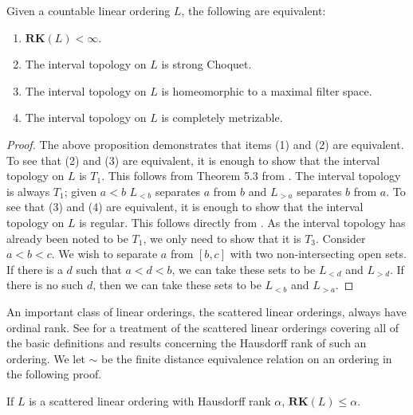 \documentclass[11pt]{amsart}
\theoremstyle{remark}
\def\RK{\textbf{RK}}
\begin{document}
\begin{theorem}
Given a countable linear ordering $L$, the following are equivalent:
\begin{enumerate}
	\item $\RK(L)<\infty$.
	\item The interval topology on $L$ is strong Choquet.
	\item The interval topology on $L$ is homeomorphic to a maximal filter space.
	\item The interval topology on $L$ is completely metrizable.
\end{enumerate}
\end{theorem}


\begin{proof}
The above proposition demonstrates that items (1) and (2) are equivalent.
To see that (2) and (3) are equivalent, it is enough to show that the interval topology on $L$ is $T_1$.
This follows from Theorem 5.3 from \cite{MS10}.
The interval topology is always $T_1$; given $a<b$ $L_{<b}$ separates $a$ from $b$ and $L_{>a}$ separates $b$ from $a$.
To see that (3) and (4) are equivalent, it is enough to show that the interval topology on $L$ is regular.
This follows directly from \cite{MS09}.
As the interval topology has already been noted to be $T_1$, we only need to show that it is $T_3$.
Consider $a<b<c$.
We wish to separate $a$ from $[b,c]$ with two non-intersecting open sets.
If there is a $d$ such that $a<d<b$, we can take these sets to be $L_{<d}$ and $L_{>d}$.
If there is no such $d$, then we can take these sets to be $L_{<b}$ and $L_{>a}$.
\end{proof}


An important class of linear orderings, the scattered linear orderings, always have ordinal rank.
See \cite[Chapter 5]{Ros} for a treatment of the scattered linear orderings covering all of the basic definitions and results concerning the Hausdorff rank of such an ordering.
We let $\sim$ be the finite distance equivalence relation on an ordering in the following proof.

\begin{proposition}
If $L$ is a scattered linear ordering with Hausdorff rank $\alpha$, $\RK(L)\leq\alpha$.
\end{proposition}
\end{document}
